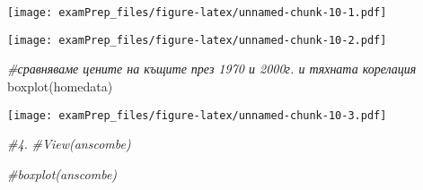 \documentclass[
]{article}
\newenvironment{Shaded}{\begin{snugshade}}{\end{snugshade}}
\newcommand{\AttributeTok}[1]{\textcolor[rgb]{0.77,0.63,0.00}{#1}}
\newcommand{\CommentTok}[1]{\textcolor[rgb]{0.56,0.35,0.01}{\textit{#1}}}
\newcommand{\FunctionTok}[1]{\textcolor[rgb]{0.00,0.00,0.00}{#1}}
\newcommand{\NormalTok}[1]{#1}
\newcommand{\OtherTok}[1]{\textcolor[rgb]{0.56,0.35,0.01}{#1}}
\newcommand{\SpecialCharTok}[1]{\textcolor[rgb]{0.00,0.00,0.00}{#1}}
\begin{document}
\begin{Shaded}
\end{Shaded}

\texttt{[image: examPrep\_files/figure-latex/unnamed-chunk-10-1.pdf]}

\begin{Shaded}
\end{Shaded}

\texttt{[image: examPrep\_files/figure-latex/unnamed-chunk-10-2.pdf]}

\begin{Shaded}
\begin{Highlighting}[]
\CommentTok{\#сравняваме цените на къщите през 1970 и 2000г. и тяхната корелация}
\FunctionTok{boxplot}\NormalTok{(homedata) }
\end{Highlighting}
\end{Shaded}

\texttt{[image: examPrep\_files/figure-latex/unnamed-chunk-10-3.pdf]}

\begin{Shaded}
\end{Shaded}

\begin{Shaded}
\begin{Highlighting}[]
\CommentTok{\#4.}
\CommentTok{\#View(anscombe)}

\CommentTok{\#boxplot(anscombe)}
\end{Highlighting}
\end{Shaded}
\end{document}
